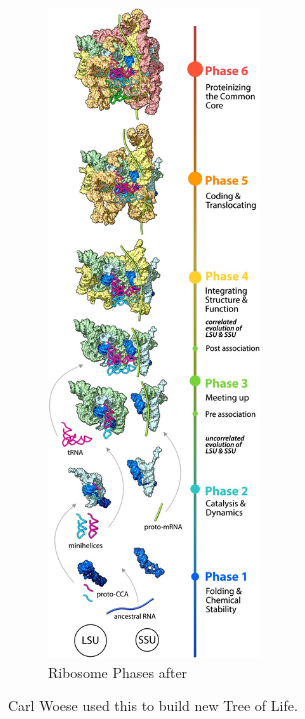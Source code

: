 \documentclass[]{article}
\begin{document}
\begin{figure}[H]
	\caption[Ribosome Phases]{Ribosome Phases after \cite{petrov2015history}}\label{fig:RibosomePhases} 
	\includegraphics[width=0.5\textwidth]{RibosomePhases}
\end{figure}

Carl Woese used this to build new Tree of Life.
\end{document}
